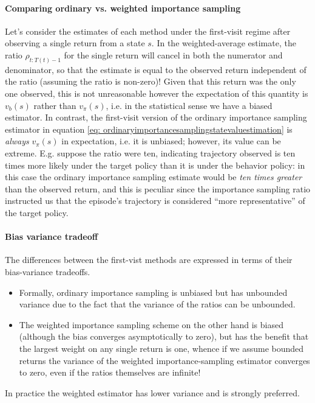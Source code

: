 \documentclass[12pt]{article}
\begin{document}
\paragraph{Comparing ordinary vs. weighted importance sampling}
Let's consider the estimates of each method under the first-visit regime after observing a single return from a state $s$. In the weighted-average estimate, the ratio $\rho_{t:T(t)-1}$ for the single return will cancel in both the numerator and denominator, so that the estimate is equal to the observed return independent of the ratio (assuming the ratio is non-zero)! Given that this return was the only one observed, this is not unreasonable however the expectation of this quantity is $v_b(s)$ rather than $v_\pi(s)$, i.e. in the statistical sense we have a biased estimator. In contrast, the first-visit version of the ordinary importance sampling estimator in equation \ref{eq: ordinaryimportancesamplingstatevaluestimation} is \emph{always} $v_\pi(s)$ in expectation, i.e. it is unbiased; however, its value can be extreme. E.g. suppose the ratio were ten, indicating trajectory observed is ten times more likely under the target policy than it is under the behavior policy: in this case the ordinary importance sampling estimate would be \emph{ten times greater} than the observed return, and this is peculiar since the importance sampling ratio instructed us that the episode's trajectory is considered ``more representative'' of the target policy.

\paragraph{Bias variance tradeoff} The differences between the first-vist methods are expressed in terms of their bias-variance tradeoffs.
\begin{itemize}
  \item Formally, ordinary importance sampling is unbiased but has unbounded     variance due to the fact that the variance of the ratios can be unbounded.
\item  The weighted importance sampling scheme on the other hand is biased (although the bias converges asymptotically to zero), but has the benefit that the largest weight on any single return is one, whence if we assume bounded returns the variance of the weighted importance-sampling estimator converges to zero, even if the ratios themselves are infinite! 
\end{itemize}
In practice the weighted estimator has lower variance and is strongly preferred.
\end{document}
